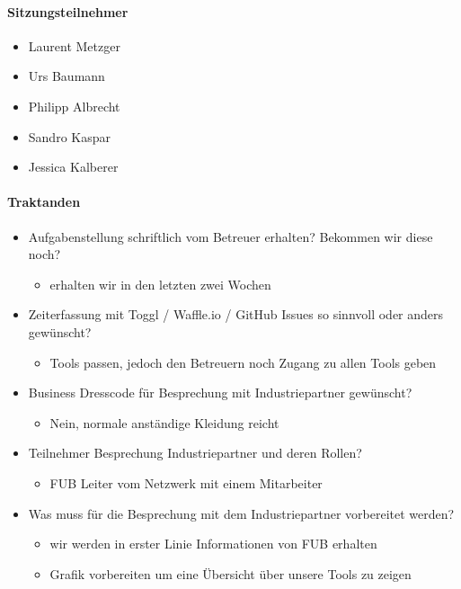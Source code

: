 \paragraph{Sitzungsteilnehmer}
\begin{itemize}	
	\item Laurent Metzger 
	\item Urs Baumann 
	\item Philipp Albrecht
	\item Sandro Kaspar
	\item Jessica Kalberer
\end{itemize}

\paragraph{Traktanden}
\begin{itemize}	
	\item Aufgabenstellung schriftlich vom Betreuer erhalten? Bekommen wir diese noch?
	\begin{itemize}
		\item erhalten wir in den letzten zwei Wochen
	\end{itemize}
	\item Zeiterfassung mit Toggl / Waffle.io / GitHub Issues so sinnvoll oder anders gewünscht?
	\begin{itemize}
		\item Tools passen, jedoch den Betreuern noch Zugang zu allen Tools geben
	\end{itemize} 
	\item Business Dresscode für Besprechung mit Industriepartner gewünscht?
	\begin{itemize}
		\item Nein, normale anständige Kleidung reicht
	\end{itemize}
	\item Teilnehmer Besprechung Industriepartner und deren Rollen?
	\begin{itemize}
		\item FUB Leiter vom Netzwerk mit einem Mitarbeiter
	\end{itemize}
	\item Was muss für die Besprechung mit dem Industriepartner vorbereitet werden?
	\begin{itemize}
		\item wir werden in erster Linie Informationen von FUB erhalten
		\item Grafik vorbereiten um eine Übersicht über unsere Tools zu zeigen

\end{itemize}
\end{itemize}
